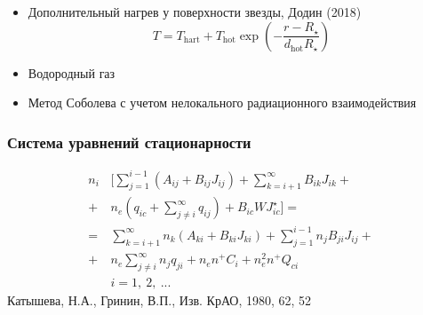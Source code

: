\documentclass{beamer}
\begin{document}

\begin{frame}
\begin{itemize}
\item Дополнительный нагрев у поверхности звезды, Додин (2018)
\begin{equation} \label{eq:temp}
 T = T_{\text{hart}} + T_\text{hot}\exp\left(-\frac{r - R_\star}{d_\text{hot} R_\star}\right)
\end{equation}
\item Водородный газ
\item Метод Соболева с учетом нелокального радиационного взаимодействия 
\end{itemize}

\end{frame}



\begin{frame}
\frametitle{Система уравнений стационарности}
\begin{align}
n_i & \Bigg[ \sum\limits_{j=1}^{i-1} (A_{ij} + B_{ij}J_{ij}) + \sum\limits_{k=i+1}^\infty B_{ik}J_{ik} + \nonumber \\
 +\ &n_e  ( q_{ic} + \sum\limits_{j \neq i}^\infty q_{ij} ) + B_{ic}WJ_{ic}^\star \Bigg] = \nonumber \\
 =\ & \sum\limits_{k=i+1}^\infty n_k (A_{ki} + B_{ki}J_{ki}) + \sum\limits_{j=1}^{i-1} n_jB_{ji}J_{ij} + \nonumber \\
 +\ & n_e \sum\limits_{j\neq i}^\infty n_jq_{ji} + n_en^+C_i + n_e^2n^+Q_{ci} \\
 & i=1,\ 2,\ ... \nonumber
\end{align}
\normalsize
\footnotesize Катышева, Н.А., Гринин, В.П., Изв. КрАО, 1980, 62, 52
\end{frame}
\end{document}
